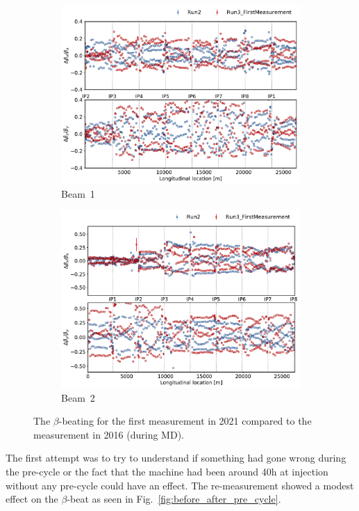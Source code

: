 \documentclass[a4paper]{cernatsnote}
\begin{document}
\begin{figure}[ht]
\begin{subfigure}{.5\textwidth}
  \centering
  \includegraphics[width=.8\linewidth]{plots/beam1/beta_beat_virgin_2016_2021.pdf}  
  \caption{Beam~1}
\end{subfigure}
\begin{subfigure}{.5\textwidth}
  \centering
  \includegraphics[width=.8\linewidth]{plots/beam2/B2_BetaBeat_2016_vs_first2021.pdf}  
  \caption{Beam~2}
\end{subfigure}
\caption{The $\beta$-beating for the first measurement in 2021 compared to the measurement in 2016 (during MD).}
\label{fig:initalVs2016}
\end{figure}

The first attempt was to try to understand if something had gone wrong during the pre-cycle or the fact that the machine had been around 40h at injection without any pre-cycle could have an effect. The re-measurement showed a modest effect on the $\beta$-beat as seen in Fig.~\ref{fig:before_after_pre_cycle}.
\end{document}
